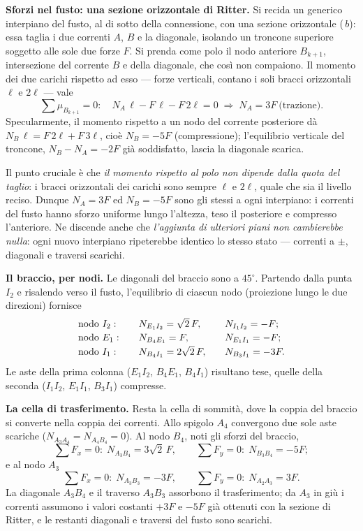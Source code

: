 \begin{esercizio}
\begin{svolgimento}
		\noindent\textbf{Sforzi nel fusto: una sezione
			orizzontale di Ritter.}
		Si recida un generico interpiano del fusto, al di
		sotto della connessione, con una sezione orizzontale
		(\,$b$): essa taglia i due
		correnti $A$, $B$ e la diagonale, isolando un troncone
		superiore soggetto alle sole due forze $F$. Si prenda
		come polo il nodo anteriore $B_{k+1}$, intersezione
		del corrente $B$ e della diagonale, che così non
		compaiono. Il momento dei due carichi rispetto ad esso
		--- forze verticali, contano i soli bracci orizzontali
		$\ell$ e $2\ell$ --- vale
		\[
		\sum \mu_{B_{k+1}} = 0:\quad
		N_A\,\ell - F\,\ell - F\,2\ell = 0
		\;\Rightarrow\;
		N_A = 3F \ \text{(trazione)} .
		\]
		Specularmente, il momento rispetto a un nodo del
		corrente posteriore dà
		$N_B\,\ell = F\,2\ell + F\,3\ell$, cioè
		$N_B = -5F$ (compressione); l'equilibrio verticale del
		troncone, $N_B - N_A = -2F$ già soddisfatto, lascia la
		diagonale scarica.
		
		\smallskip
		Il punto cruciale è che \emph{il momento rispetto al
			polo non dipende dalla quota del taglio}: i bracci
		orizzontali dei carichi sono sempre $\ell$ e $2\ell$,
		quale che sia il livello reciso. Dunque $N_A=3F$ ed
		$N_B=-5F$ sono gli stessi a ogni interpiano: i correnti
		del fusto hanno sforzo uniforme lungo l'altezza, teso
		il posteriore e compresso l'anteriore. Ne discende
		anche che \emph{l'aggiunta di ulteriori piani non
			cambierebbe nulla}: ogni nuovo interpiano
		ripeterebbe identico lo stesso stato --- correnti a
		$\pm$, diagonali e traversi scarichi.
		
		\noindent\textbf{Il braccio, per nodi.}
		Le diagonali del braccio sono a $45^\circ$. Partendo
		dalla punta $I_2$ e risalendo verso il fusto,
		l'equilibrio di ciascun nodo (proiezione lungo le due
		direzioni) fornisce
		\[
		\begin{array}{@{}l@{\qquad}l@{\qquad}l@{}}
			\text{nodo } I_2: & N_{E_1I_2} = \sqrt2\,F, & N_{I_1I_2} = -F;\\[2pt]
			\text{nodo } E_1: & N_{B_4E_1} = F,          & N_{E_1I_1} = -F;\\[2pt]
			\text{nodo } I_1: & N_{B_4I_1} = 2\sqrt2\,F, & N_{B_3I_1} = -3F.
		\end{array}
		\]
		Le aste della prima colonna ($E_1I_2$, $B_4E_1$,
		$B_4I_1$) risultano tese, quelle della seconda
		($I_1I_2$, $E_1I_1$, $B_3I_1$) compresse.
		
		\noindent\textbf{La cella di trasferimento.}
		Resta la cella di sommità, dove la coppia del braccio
		si converte nella coppia dei correnti. Allo spigolo
		$A_4$ convergono due sole aste scariche
		($N_{A_3A_4}=N_{A_4B_4}=0$). Al nodo $B_4$, noti gli
		sforzi del braccio,
		\[
		\sum F_x = 0:\; N_{A_3B_4} = 3\sqrt2\,F,
		\qquad
		\sum F_y = 0:\; N_{B_3B_4} = -5F ;
		\]
		e al nodo $A_3$
		\[
		\sum F_x = 0:\; N_{A_3B_3} = -3F,
		\qquad
		\sum F_y = 0:\; N_{A_2A_3} = 3F .
		\]
		La diagonale $A_3B_4$ e il traverso $A_3B_3$ assorbono
		il trasferimento; da $A_3$ in giù i correnti assumono i
		valori costanti $+3F$ e $-5F$ già ottenuti con la
		sezione di Ritter, e le restanti diagonali e traversi
		del fusto sono scarichi.
		

\end{svolgimento}
\end{esercizio}

